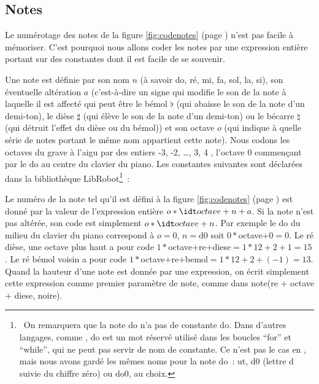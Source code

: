 

\subsection{Notes}

\noindent Le numérotage des notes de la figure \ref{fig:codenotes} (page \pageref{fig:codenotes}) n'est
pas facile à mé\-mo\-ri\-ser. C'est pourquoi nous allons coder les notes par
une expression entière portant sur des constantes dont il est facile de se souvenir.

Une note est définie par son nom $n$ (à savoir do, ré, mi, fa, sol, la, si), son éventuelle
altération $a$ (c'est-à-dire un signe qui modifie le son de la note à laquelle il est affecté
qui peut être le bémol $\flat$ (qui abaisse le son de la note d'un demi-ton),
le dièse $\sharp$ (qui élève le son de la note d'un demi-ton) ou
le bécarre $\natural$ (qui détruit l'effet du dièse ou du bémol)) et
son octave $o$ (qui indique à quelle série de notes portant le même nom appartient cette note).
Nous codons les octaves du grave à l'aigu par des entiers -3, -2, \ldots, 3, 4 ,
l'octave 0 commençant par le do au centre du clavier du piano. Les
constantes suivantes sont déclarées dans la bibliothèque {\idt LibRobot}\footnote{\ On remarquera que la note do n'a pas
de constante {\idt do}. Dans d'autres langages, comme \ocaml, {\mcl do} est un mot réservé
utilisé dans les boucles ``for'' et ``while'', qui ne peut pas servir de nom de constante.
Ce n'est pas le cas en \python, mais nous avons gardé les mêmes noms pour la note do~:
{\idt ut}, {\idt d0} (lettre d suivie du chiffre zéro) ou {\idt do0}, au choix.}~:



\noindent Le numéro de la note tel qu'il est  défini à la figure \ref{fig:codenotes}
(page \pageref{fig:codenotes}) est donné par la valeur de l'expression entière
$o \ast {\idt octave} + n + a$. Si la note n'est pas altérée, son code est simplement
$o \ast {\idt octave} + n$. Par exemple le do du milieu du clavier du piano correspond à
$o = 0$, $n = ${\idt d0} soit $0 \ast ${\idt octave}$ + 0 = 0$. Le ré dièse, une octave plus haut
a pour code $1 \ast ${\idt octave}$ + ${\idt re}$ + ${\idt diese}$
= 1 \ast 12 + 2 + 1 = 15$. Le ré bémol voisin
a pour code $1 \ast ${\idt octave}$ + ${\idt re}$ + ${\idt bemol}$
= 1 \ast 12 + 2 + (-1) = 13$. Quand la hauteur d'une note est donnée par une expression,
on écrit simplement cette expression comme premier paramètre de {\idt note}, comme dans {\idt note(re + octave + diese, noire)}.

